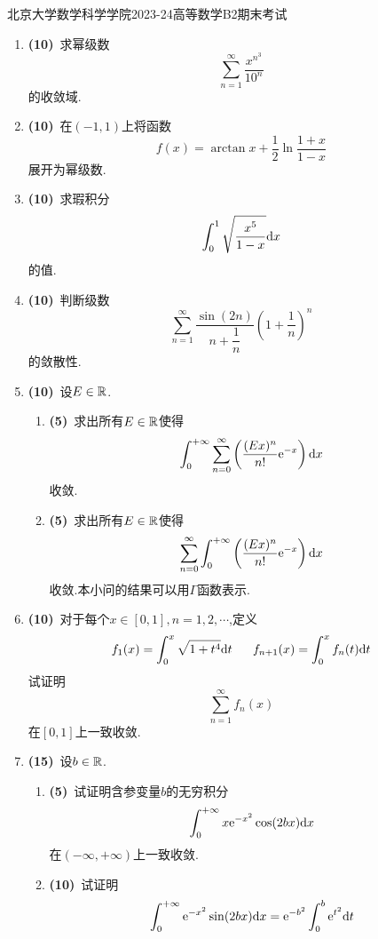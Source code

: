 \documentclass{ctexart}
\begin{document}
\pagestyle{empty}
\begin{center}\Large
    北京大学数学科学学院2023-24高等数学B2期末考试
\end{center}
\begin{enumerate}[leftmargin=*,label=\textbf{\arabic*.},topsep=0pt,parsep=0pt,itemsep=0pt,partopsep=0pt]
    \item \textbf{(10)}\ 求幂级数
        \[\sum_{n=1}^{\infty}\dfrac{x^{n^3}}{10^n}\]
        的收敛域.

    \item \textbf{(10)}\ 在$(-1,1)$上将函数
        \[f(x)=\arctan x+\dfrac12\ln\dfrac{1+x}{1-x}\]
        展开为幂级数.

    \item \textbf{(10)}\ 求瑕积分
        \[\int_0^1\sqrt{\dfrac{x^5}{1-x}}\mathrm{d} x\]
        的值.

    \item \textbf{(10)}\ 判断级数
        \[\sum_{n=1}^{\infty}\dfrac{\sin(2n)}{n+\dfrac1n}\left(1+\dfrac1n\right)^n\]
        的敛散性.

    \item \textbf{(10)}\ 设$E\in\mathbb{R}$.
        \begin{enumerate}[label=\tbf{(\arabic*)},topsep=0pt,parsep=0pt,itemsep=0pt,partopsep=0pt]
            \item \textbf{(5)}\ 求出所有$E\in\mathbb{R}$使得
                \[\int_0^{+\infty}\sum_{n=0}^{\infty}\left(\dfrac{(Ex)^n}{n!}\mathrm{e}^{-x}\right)\mathrm{d} x\]
                收敛.
            \item \textbf{(5)}\ 求出所有$E\in\mathbb{R}$使得
                \[\sum_{n=0}^{\infty}\int_0^{+\infty}\left(\dfrac{(Ex)^n}{n!}\mathrm{e}^{-x}\right)\mathrm{d} x\]
                收敛.本小问的结果可以用$\Gamma$函数表示.
        \end{enumerate}

    \item \textbf{(10)}\ 对于每个$x\in[0,1],n=1,2,\cdots$,定义
        \[f_1(x)=\int_0^x\sqrt{1+t^4}\di t\ \ \ \ \ f_{n+1}(x)=\int_0^xf_n(t)\di t\]
        试证明
        \[\sum_{n=1}^{\infty}f_n(x)\]
        在$[0,1]$上一致收敛.

    \item \textbf{(15)}\ 设$b\in\mathbb{R}$.
        \begin{enumerate}[label=\tbf{(\arabic*)},topsep=0pt,parsep=0pt,itemsep=0pt,partopsep=0pt]
            \item \textbf{(5)}\ 试证明含参变量$b$的无穷积分
                \[\int_0^{+\infty}x\mathrm{e}^{-x^2}\cos(2bx)\mathrm{d} x\]
                在$(-\infty,+\infty)$上一致收敛.
            \item \textbf{(10)}\ 试证明
                \[\int_0^{+\infty}\mathrm{e}^{-x^2}\sin(2bx)\mathrm{d} x=\mathrm{e}^{-b^2}\int_0^b\mathrm{e}^{t^2}\mathrm{d} t\]
        \end{enumerate}


\end{enumerate}
\end{document}
